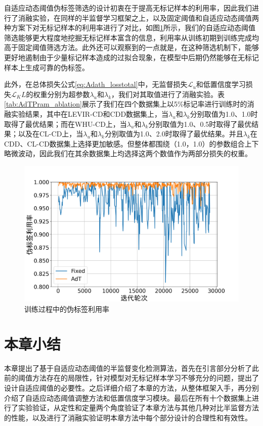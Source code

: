 \documentclass[lang=chs, degree=master, blindreview=false, adobe=false]{yanputhesis}
\begin{document}
自适应动态阈值伪标签筛选的设计初衷在于提高无标记样本的利用率，因此我们进行了消融实验，在同样的半监督学习框架之上，以及固定阈值和自适应动态阈值两种方案下对无标记样本的利用率进行了对比，如图\ref{fig:AdT_util}所示，我们的自适应动态阈值筛选能够更大程度地挖掘无标记样本富含的信息，利用率从训练初期到训练完成均高于固定阈值筛选方法。此外还可以观察到的一点就是，在这种筛选机制下，能够更好地遏制由于少量标记样本造成的过拟合现象，在模型中后期仍然能够在无标记样本上生成可靠的伪标签。

此外，在总体损失公式\ref{eq:Adath_losstotal}中，无监督损失$\mathcal{L}_u$和低置信度学习损失$\mathcal{L}_KL$的权重分别为超参数$\lambda_u$和$\lambda_k$，我们对其取值进行了消融实验。表\ref{tab:AdTPram_ablation}展示了我们在四个数据集上以5$\%$标记率进行训练时的消融实验结果，其中在LEVIR-CD和CDD数据集上，当$\lambda_u$和$\lambda_k$分别取值为1.0、1.0时取得了最优结果；而在WHU-CD上，当$\lambda_u$和$\lambda_k$分别取值为1.0、0.5时取得了最优结果；以及在CL-CD上，当$\lambda_u$和$\lambda_k$分别取值为1.0、2.0时取得了最优结果。并且$\lambda_k$在CDD、CL-CD数据集上选择更加敏感。但整体都围绕（1.0，1.0）的参数组合上下略微波动，因此我们在其余数据集上均选择这两个数值作为两部分损失的权重。
\begin{figure}[!htbp]
  \centering
  \includegraphics[scale=0.35]{images/AdTutil_ratio.png}
  \caption{
    训练过程中的伪标签利用率
  }
  \label{fig:AdT_util}
\end{figure}
\section{本章小结}
本章提出了基于自适应动态阈值的半监督变化检测算法，首先在引言部分分析了此前的阈值方法存在的局限性，针对模型对无标记样本学习不够充分的问题，提出了设计自适应阈值的必要性。之后详细介绍了本章的方法，从整体框架入手，再分别介绍了自适应动态阈值调整方法和低置信度学习模块。最后在所有十个数据集上进行了实验验证，从定性和定量两个角度验证了本章方法与其他几种对比半监督方法的性能，以及进行了消融实验证明本章方法中每个部分设计的合理性和有效性。
\end{document}
